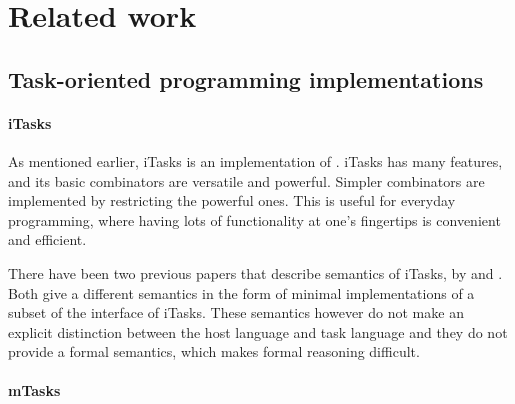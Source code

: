 


\section{Related work}
\label{sec:relatedwork}




\subsection{Task-oriented programming implementations}

\paragraph{iTasks}

As mentioned earlier, iTasks is an implementation of \TOP. iTasks has many
features, and its basic combinators are versatile and powerful. Simpler
combinators are implemented by restricting the powerful ones. This is useful for
everyday programming, where having lots of functionality at one's fingertips is
convenient and efficient.

There have been two previous papers that describe semantics of iTasks, by
\citet{conf/ifl/KoopmanPA08} and \citet{conf/ppdp/PlasmeijerLMAK12}.
Both give a different semantics in the form of minimal implementations of a
subset of the interface of iTasks. These semantics however do not make an
explicit distinction between the host language and task language and they do not
provide a formal semantics, which makes formal reasoning difficult.

\paragraph{mTasks}


